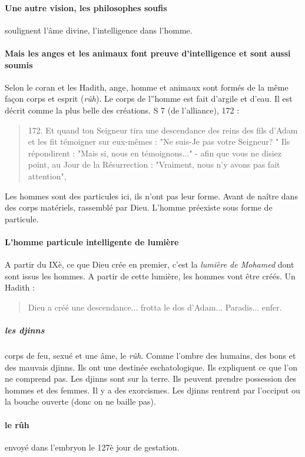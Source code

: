 \paragraph{Une autre vision, les philosophes soufis} soulignent l'âme divine, l'intelligence dans l'homme.

\paragraph{Mais les anges et les animaux font preuve d'intelligence et sont aussi soumis} Selon le coran et les Hadith, ange, homme et animaux sont formés de la même façon corps et esprit (\emph{rûh}).  Le corps de l''homme est fait d'argile et d'eau. Il est décrit comme la plus belle des créations.
S 7 (de l'alliance), 172 : 
\begin{quote}
172. Et quand ton Seigneur tira une descendance des reins des fils d'Adam et les fit témoigner sur eux-mêmes : "Ne suis-Je pas votre Seigneur? " Ils répondirent : "Mais si, nous en témoignons..." - afin que vous ne disiez point, au Jour de la Résurrection : "Vraiment, nous n'y avons pas fait attention",
\end{quote}
Les hommes sont des particules ici, ils n'ont pas leur forme. Avant de naître dans des corps matériels, rassemblé par Dieu. L'homme préexiste sous forme de particule.

\paragraph{L'homme particule intelligente de lumière} A partir du IXè, ce que Dieu crée en premier, c'est la \textit{lumière de Mohamed} dont sont issus les hommes. A partir de cette lumière, les hommes vont être créés. Un Hadith :
\begin{quote}
Dieu a créé une descendance... frotta le dos d'Adam... Paradis... enfer. 
\end{quote}

\subparagraph{les djinns} corps de feu, sexué et une âme, le \textit{rûh}. Comme l'ombre des humains, des bons et des mauvais djinns. Ils ont une destinée eschatologique. Ils expliquent ce que l'on ne comprend pas. Les djinns sont sur la terre. Ils peuvent prendre possession des hommes et des femmes. Il y a des exorcismes. Les djinns rentrent par l'occiput ou la bouche ouverte (donc on ne baille pas).

\paragraph{le rûh} envoyé dans l'embryon le 127è jour de gestation. 

